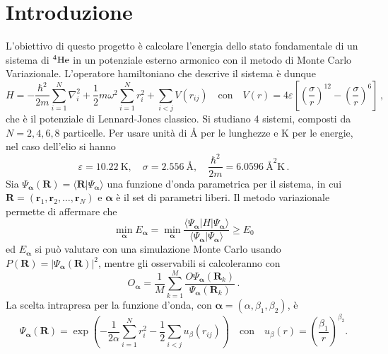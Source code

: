 \documentclass[a4paper, titlepage]{article}
\begin{document}

\newcommand{\sch}[0]{Schrödinger }
\newcommand{\lj}[0]{Lennard-Jones }
\newcommand{\boldalpha}[0]{{\boldsymbol{\alpha}}}

\section{Introduzione}
L'obiettivo di questo progetto è calcolare l'energia dello stato fondamentale di un sistema di $^4\ce{He}$ in un potenziale esterno armonico con il metodo di Monte Carlo Variazionale. L'operatore hamiltoniano che descrive il sistema è dunque
\begin{equation*}
    H = -\frac{\hbar^2}{2m} \sum_{i = 1}^N \nabla_i^2 + \frac{1}{2} m\omega^2 \sum_{i = 1}^N r_i^2 + \sum_{i < j} V(r_{ij}) 
    \quad\text{con}\quad 
    V(r) = 4\varepsilon\left[\left(\frac{\sigma}{r}\right)^{12} - \left(\frac{\sigma}{r}\right)^{6}\right]\, ,
\end{equation*}
che è il potenziale di \lj classico. Si studiano 4 sistemi, composti da $N = 2, 4, 6, 8$ particelle. Per usare unità di \unit{\angstrom} per le lunghezze e \unit{\kelvin} per le energie, nel caso dell'elio si hanno
\[
\varepsilon = 10.22\ \unit{\kelvin}, \quad
\sigma = 2.556\ \unit{\angstrom}, \quad 
\frac{\hbar^2}{2m} = 6.0596\ \unit{\square\angstrom\kelvin}\, .
\]
Sia $\Psi_{\boldsymbol{\alpha}}(\mathbf{R}) = \langle\mathbf{R}|\Psi_{\boldsymbol{\alpha}}\rangle$ una funzione d'onda parametrica per il sistema, in cui $\mathbf{R} = (\mathbf{r}_1, \mathbf{r}_2, \dots, \mathbf{r}_N)$ e $\boldsymbol{\alpha}$ è il set di parametri liberi. Il metodo variazionale permette di affermare che
\[
\min_{\boldsymbol{\alpha}} E_{\boldsymbol{\alpha}} = \min_{\boldsymbol{\alpha}} \frac{\langle\Psi_{\boldsymbol{\alpha}}|H|\Psi_{\boldsymbol{\alpha}}\rangle}{\langle\Psi_{\boldsymbol{\alpha}}|\Psi_{\boldsymbol{\alpha}}\rangle} \geq E_0
\]
ed $E_{\boldsymbol{\alpha}}$ si può valutare con una simulazione Monte Carlo usando $P(\mathbf{R}) = |\Psi_{\boldsymbol{\alpha}}(\mathbf{R})|^2$, mentre gli osservabili si calcoleranno con
\[
O_\boldalpha = \frac{1}{M}\sum_{k = 1}^M \frac{O\Psi_\boldalpha(\mathbf{R}_k)}{\Psi_\boldalpha(\mathbf{R}_k)}\, .
\]
La scelta intrapresa per la funzione d'onda, con $\boldalpha = (\alpha, \beta_1, \beta_2)$, è 
\[
\Psi_\boldalpha(\mathbf{R}) = \exp\left(-\frac{1}{2\alpha}\sum_{i = 1}^Nr_i^2-\frac{1}{2}\sum_{i < j}u_\beta(r_{ij})\right) \quad\text{con}\quad u_\beta(r) = \left(\frac{\beta_1}{r}\right)^{\beta_2}.
\]
\end{document}
